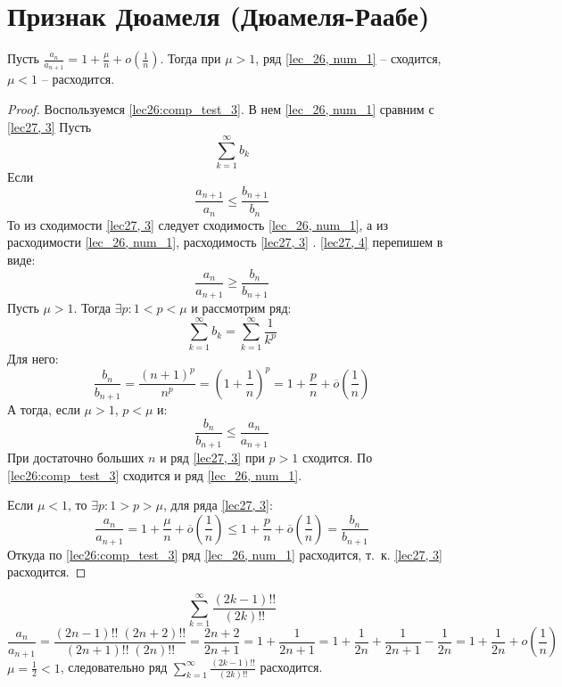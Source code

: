 \documentclass[../../main.tex]{subfiles}
\begin{document}
	\section{Признак Дюамеля (Дюамеля-Раабе)}
	
	\begin{thm}\label{lec27,duamele_raabe}
		Пусть $\frac{a_n}{a_{n+1}} = 1 + \frac{\mu}{n} + o\left( \frac{1}{n}\right) 
		$. Тогда при $\mu > 1$, ряд \ref{lec_26, num_1} \--- сходится, $\mu < 1$ 
		\--- расходится.
		\begin{proof}
			Воспользуемся \ref{lec26:comp_test_3}. В нем \ref{lec_26, num_1} сравним с 
			\ref{lec27, 3}
			Пусть \begin{equation} \label{lec27, 3}
			\sum_{k = 1}^{\infty} b_k
			\end{equation}
			Если \begin{equation}\label{lec27, 4}
			\frac{a_{n+1}}{a_n} \le \frac{b_{n+1}}{b_n}
			\end{equation}
			То из сходимости \ref{lec27, 3} следует сходимость \ref{lec_26, num_1}, а 
			из расходимости  \ref{lec_26, num_1}, расходимость \ref{lec27, 3} . 
			\ref{lec27, 4} перепишем в виде:
			\begin{equation} \label{lec27,(5)}
			\frac{a_n}{a_{n+1}} \ge \frac{b_n}{b_{n+1}}
			\end{equation}
			Пусть $\mu > 1$. Тогда $\exists p :  1 < p < \mu$ и рассмотрим ряд:
			\[  \sum_{k=1}^{\infty} b_k = \sum_{k=1}^{\infty} \frac{1}{k^p}    \]
			Для него:
			\[ \frac{b_n}{b_{n+1}} = \frac{(n+1)^p}{n^p} = \left( 1 + \frac{1}{n} 
			\right)^p = 1 + \frac{p}{n} + \overline{o}\left( \frac{1}{n} \right)       
			\]
			А тогда, если $\mu > 1$, $p < \mu$ и:
			\[ \frac{b_n}{b_{n+1}} \le \frac{a_n}{a_{n+1}}      \]
			При достаточно больших $n$ и ряд \ref{lec27, 3} при $p > 1$ сходится. По 
			\ref{lec26:comp_test_3} сходится и ряд \ref{lec_26, num_1}.
			
			Если $\mu < 1$, то $\exists p : 1 > p > \mu$, для ряда \ref{lec27, 3}:
			\[  \frac{a_n}{a_{n+1}} = 1 + \frac{\mu}{n} + \overline{o}\left( 
			\frac{1}{n} \right) \le  1 + \frac{p}{n} + \overline{o}\left( \frac{1}{n} 
			\right) = \frac{b_n}{b_{n+1}}                   \]
			Откуда по \ref{lec26:comp_test_3} ряд \ref{lec_26, num_1} расходится, т.~к. 
			\ref{lec27, 3} расходится.
		\end{proof}
	\end{thm}	
	
	
	\begin{example}
		\[ \sum_{k=1}^{\infty} \frac{(2k-1)!!}{(2k)!!}    \]
		\[ \frac{a_n}{a_{n+1}} = \frac{ (2n-1)!! \; (2n+2)!!}{ (2n+1)!! \;  (2n)!! } 
		= \frac{2n+2}{2n+1} = 1 + \frac{1}{2n+1} = 1 + \frac{1}{2n} + \frac{1}{2n+1} 
		- \frac{1}{2n} = 1 + \frac{1}{2n} + o\left( \frac{1}{n} \right)     \]
		$\mu = \frac{1}{2} < 1$, следовательно ряд $\sum_{k=1}^{\infty} 
		\frac{(2k-1)!!}{(2k)!!}$ расходится.
		
	\end{example}	
\end{document}
